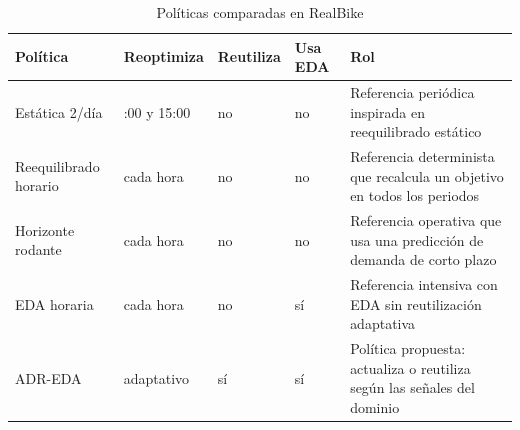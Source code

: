 \begin{table}[htbp]
\centering
\scriptsize
\caption{Políticas comparadas en RealBike}
\label{tab:realbike-politicas}
\begin{tabularx}{\textwidth}{
    >{\raggedright\arraybackslash}p{2.7cm}
    >{\raggedright\arraybackslash}p{2.3cm}
    >{\centering\arraybackslash}p{1.5cm}
    >{\centering\arraybackslash}p{1.3cm}
    >{\raggedright\arraybackslash}X
}
\toprule
Política & Reoptimiza & Reutiliza & Usa EDA & Rol \\
\midrule
Estática 2/día & 03:00 y 15:00 & no & no & Referencia periódica inspirada en reequilibrado estático\\
Reequilibrado horario & cada hora & no & no & Referencia determinista que recalcula un objetivo en todos los periodos\\
Horizonte rodante & cada hora & no & no & Referencia operativa que usa una predicción de demanda de corto plazo\\
EDA horaria & cada hora & no & sí & Referencia intensiva con EDA sin reutilización adaptativa\\
ADR-EDA & adaptativo & sí & sí & Política propuesta: actualiza o reutiliza según las señales del dominio\\
\bottomrule
\end{tabularx}
\end{table}

